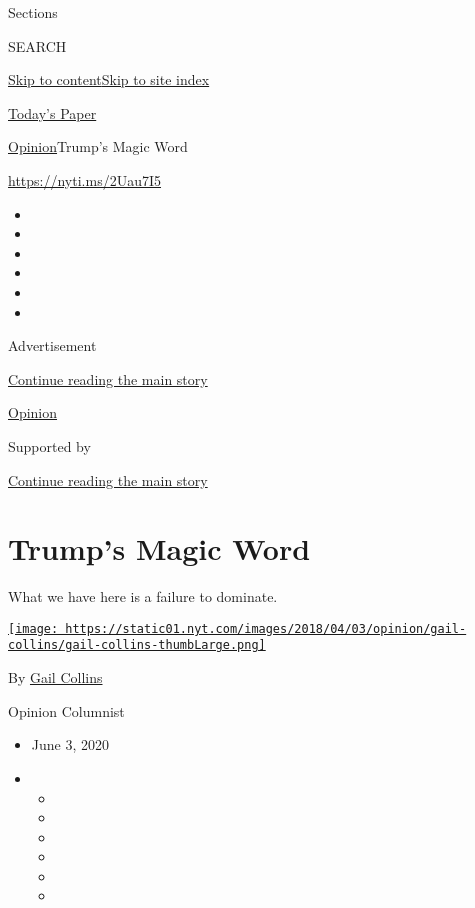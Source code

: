 Sections

SEARCH

\protect\hyperlink{site-content}{Skip to
content}\protect\hyperlink{site-index}{Skip to site index}

\href{https://myaccount.nytimes.com/auth/login?response_type=cookie\&client_id=vi}{}

\href{https://www.nytimes.com/section/todayspaper}{Today's Paper}

\href{/section/opinion}{Opinion}\textbar{}Trump's Magic Word

\href{https://nyti.ms/2Uau7I5}{https://nyti.ms/2Uau7I5}

\begin{itemize}
\item
\item
\item
\item
\item
\item
\end{itemize}

Advertisement

\protect\hyperlink{after-top}{Continue reading the main story}

\href{/section/opinion}{Opinion}

Supported by

\protect\hyperlink{after-sponsor}{Continue reading the main story}

\hypertarget{trumps-magic-word}{%
\section{Trump's Magic Word}\label{trumps-magic-word}}

What we have here is a failure to dominate.

\href{https://www.nytimes.com/by/gail-collins}{\texttt{[image: https://static01.nyt.com/images/2018/04/03/opinion/gail-collins/gail-collins-thumbLarge.png]}}

By \href{https://www.nytimes.com/by/gail-collins}{Gail Collins}

Opinion Columnist

\begin{itemize}
\item
  June 3, 2020
\item
  \begin{itemize}
  \item
  \item
  \item
  \item
  \item
  \item
  \end{itemize}
\end{itemize}

